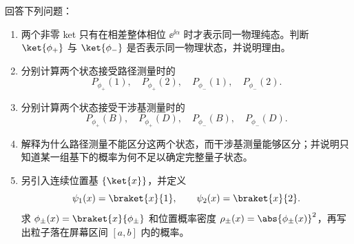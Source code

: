 回答下列问题：
\begin{enumerate}[leftmargin=*]
  \item 两个非零 ket 只有在相差整体相位 $\ee^{\ii\alpha}$ 时才表示同一物理纯态。判断 $\ket{\phi_+}$ 与 $\ket{\phi_-}$ 是否表示同一物理状态，并说明理由。
  \item 分别计算两个状态接受路径测量时的
  \[
    P_{\phi_+}(1),\quad P_{\phi_+}(2),\quad
    P_{\phi_-}(1),\quad P_{\phi_-}(2).
  \]
  \item 分别计算两个状态接受干涉基测量时的
  \[
    P_{\phi_+}(B),\quad P_{\phi_+}(D),\quad
    P_{\phi_-}(B),\quad P_{\phi_-}(D).
  \]
  \item 解释为什么路径测量不能区分这两个状态，而干涉基测量能够区分；并说明只知道某一组基下的概率为何不足以确定完整量子状态。
  \item 另引入连续位置基 $\{\ket{x}\}$，并定义
  \[
    \psi_1(x)=\braket{x}{1},
    \qquad
    \psi_2(x)=\braket{x}{2}.
  \]
  求 $\phi_\pm(x)=\braket{x}{\phi_\pm}$ 和位置概率密度 $\rho_\pm(x)=\abs{\phi_\pm(x)}^2$，再写出粒子落在屏幕区间 $[a,b]$ 内的概率。
\end{enumerate}

